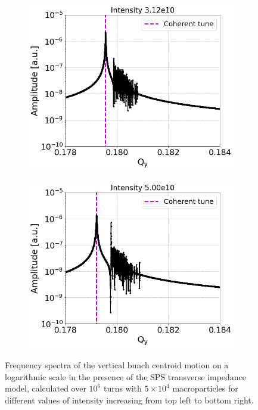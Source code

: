 \begin{figure}[htp]
\begin{subfigure}{.45\textwidth}
        \label{fig:study_9d}
    \end{subfigure}
    \begin{subfigure}{.45\textwidth}
        \centering
        \includegraphics[width=.95\linewidth]{images/Ch7/fft_sps_forSchottky_tbt_270GeV_PN1e-8_WakesON_ayy6000_QpxQpy0_6D_Nb1e4_InialOffsetY1e-4m_turns1e6_IntensityScan_intensity3.12e10.png}  
        \label{fig:study_9e}
    \end{subfigure}
    \begin{subfigure}{.45\textwidth}
            \centering
            \includegraphics[width=.95\linewidth]{images/Ch7/fft_sps_forSchottky_tbt_270GeV_PN1e-8_WakesON_ayy6000_QpxQpy0_6D_Nb1e4_InialOffsetY1e-4m_turns1e6_IntensityScan_intensity5.00e10.png}  
            \label{fig:study_9f}
    \end{subfigure}
    \caption{Frequency spectra of the vertical bunch centroid motion on a logarithmic scale in the presence of the SPS transverse impedance model, calculated over $10^6$ turns with $5 \times 10^4$ macroparticles for different values of intensity increasing from top left to bottom right.}
    \label{fig:study_9_schottky_noise_intnensity_scan}
\end{figure}

